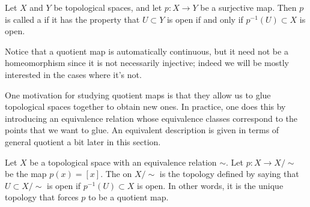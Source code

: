 \begin{defn}
  Let $X$ and $Y$ be topological spaces, and let $p : X \to Y$ be a surjective map. Then $p$ is called a  if it has the property that $U \subset Y$ is open if and only if $p^{-1}(U) \subset X$ is open.
\end{defn}
Notice that a quotient map is automatically continuous, but it need not be a homeomorphism since it is not necessarily injective; indeed we will be mostly interested in the cases where it's not.

One motivation for studying quotient maps is that they allow us to glue topological spaces together to obtain new ones. In practice, one does this by introducing an equivalence relation whose equivalence classes correspond to the points that we want to glue. An equivalent description is given in terms of general quotient a bit later in this section.

\begin{defn}
  \label{def-quotient-topology}
  Let $X$ be a topological space with an equivalence relation $\sim$. Let $p : X \to X/\!\sim$ be the map $p(x) = [x]$. The  on $X/\!\sim$ is the topology defined by saying that $U \subset X/\!\sim$ is open if $p^{-1}(U) \subset X$ is open. In other words, it is the unique topology that forces $p$ to be a quotient map.
\end{defn}

